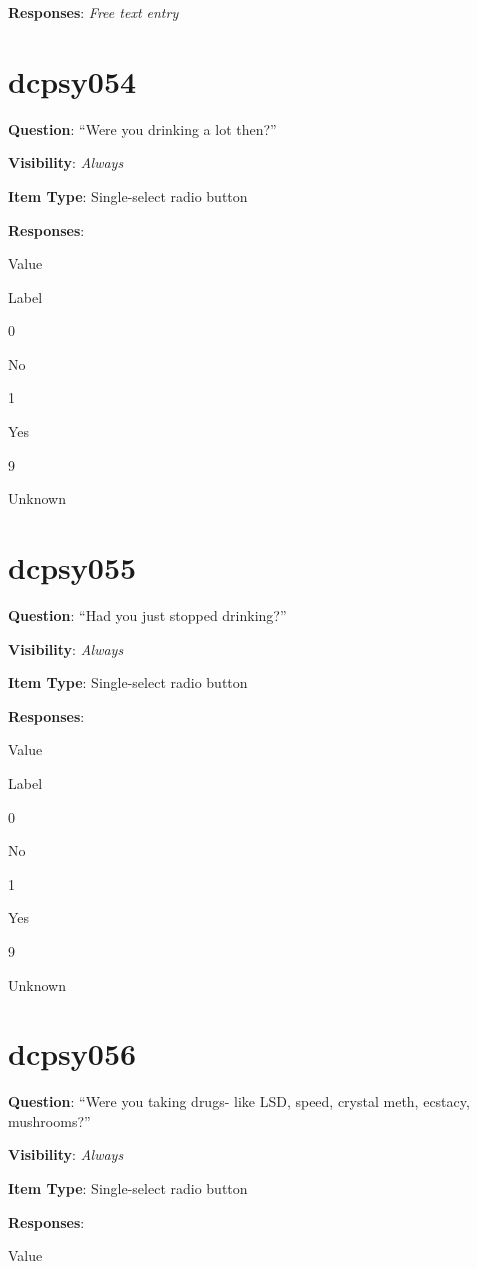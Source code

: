 \documentclass[]{book}
\begin{document}
\textbf{Responses}: \emph{Free text entry}

\hypertarget{dcpsy054}{%
\section{dcpsy054}\label{dcpsy054}}

\textbf{Question}: ``Were you drinking a lot then?''

\textbf{Visibility}: \emph{Always}

\textbf{Item Type}: Single-select radio button

\textbf{Responses}:

Value

Label

0

No

1

Yes

9

Unknown

\hypertarget{dcpsy055}{%
\section{dcpsy055}\label{dcpsy055}}

\textbf{Question}: ``Had you just stopped drinking?''

\textbf{Visibility}: \emph{Always}

\textbf{Item Type}: Single-select radio button

\textbf{Responses}:

Value

Label

0

No

1

Yes

9

Unknown

\hypertarget{dcpsy056}{%
\section{dcpsy056}\label{dcpsy056}}

\textbf{Question}: ``Were you taking drugs- like LSD, speed, crystal meth, ecstacy, mushrooms?''

\textbf{Visibility}: \emph{Always}

\textbf{Item Type}: Single-select radio button

\textbf{Responses}:

Value
\end{document}
